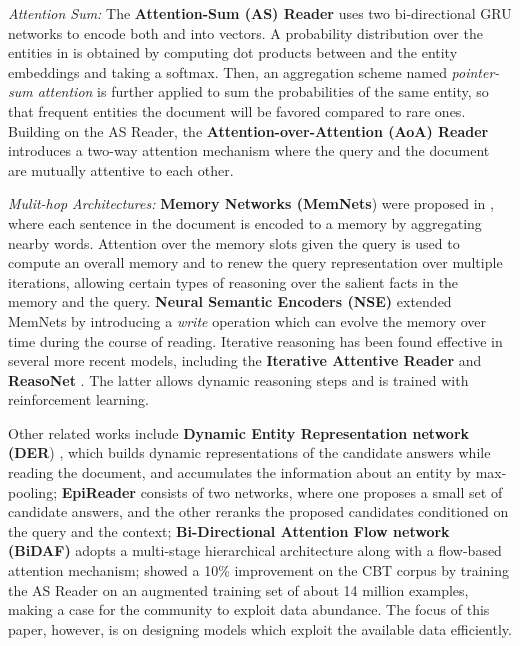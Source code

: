 \documentclass[11pt,a4paper]{article}
\begin{document}
\textit{Attention Sum:} The \textbf{Attention-Sum (AS) Reader}
\citep{kadlec2016text} uses two bi-directional GRU networks \citep{cho2014learning} to encode both  and  into vectors.
A probability distribution over the entities in 
is obtained by computing dot products between  and the entity embeddings and taking a softmax. 
Then, an aggregation scheme named \emph{pointer-sum attention}
is further applied to sum the probabilities of the same entity,
so that frequent entities the document will be favored
compared to rare ones. 
Building on the AS Reader,
the \textbf{Attention-over-Attention (AoA) Reader} \citep{cui2016attention} 
introduces a two-way attention mechanism where the query and the document are mutually attentive to each other.

\textit{Mulit-hop Architectures:} \textbf{Memory Networks (MemNets}) were proposed in \citet{weston2014memory},
where each sentence in the document is encoded to a memory by aggregating nearby words. 
Attention over the memory slots given the query is used to compute an overall memory and to renew the query representation over multiple iterations, allowing certain types of reasoning over the salient facts in the memory and the query. 
\textbf{Neural Semantic Encoders (NSE)} \citep{munkhdalai2016neural} extended MemNets by introducing a \textit{write} operation which can evolve the memory over time during the course of reading.
Iterative reasoning has been found effective in several more recent models,
including the \textbf{Iterative Attentive Reader} \citep{sordoni2016iterative} and \textbf{ReasoNet} \citep{shen2016reasonet}.
The latter allows dynamic reasoning steps
and is trained with reinforcement learning. 



Other related works include \textbf{Dynamic Entity Representation network (DER}) \citep{kobayashi2016dynamic},
which builds dynamic representations of the candidate answers while reading the document, and accumulates the information about an entity by max-pooling;
\textbf{EpiReader} \citep{trischler2016natural}
consists of two networks, where one proposes a small set of candidate answers, and the other reranks the proposed candidates conditioned on the query and the context; \textbf{Bi-Directional Attention Flow network (BiDAF)} \cite{seo2016bidirectional} adopts a multi-stage hierarchical architecture along with a flow-based attention mechanism;
\citet{bajgar2016embracing} showed a 10\% improvement on the CBT corpus \citep{hill2015goldilocks} by training the AS Reader on an augmented training set of about 14 million examples, making a case for the community to exploit data abundance. The focus of this paper, however, is on designing models which exploit the available data efficiently.
\end{document}
